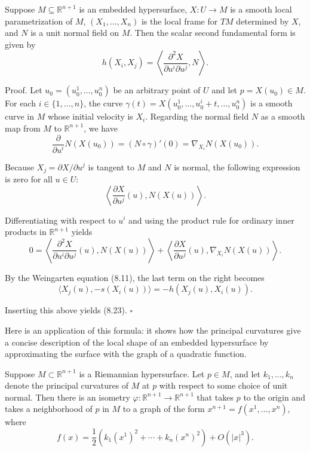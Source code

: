 \begin{proposition}
\label{prop:second-fundamental-form-coordinate-formula}
Suppose $M \subseteq \mathbb{R}^{n+1}$ is an embedded hypersurface, $X: U \to M$ is a smooth local parametrization of $M$, $(X_1,\ldots,X_n)$ is the local frame for $TM$ determined by $X$, and $N$ is a unit normal field on $M$. Then the scalar second fundamental form is given by
\begin{equation}
h(X_i, X_j) = \left\langle \frac{\partial^2 X}{\partial u^i \partial u^j}, N \right\rangle.
\tag{8.23}
\end{equation}
\end{proposition}

Proof. Let $u_0 = (u_0^1, \ldots, u_0^n)$ be an arbitrary point of $U$ and let $p = X(u_0) \in M$. For each $i \in \{1,\ldots,n\}$, the curve $\gamma(t) = X(u_0^1, \ldots, u_0^i + t, \ldots, u_0^n)$ is a smooth curve in $M$ whose initial velocity is $X_i$. Regarding the normal field $N$ as a smooth map from $M$ to $\mathbb{R}^{n+1}$, we have
\[
\frac{\partial}{\partial u^i} N(X(u_0)) = (N \circ \gamma)'(0) = \nabla_{X_i} N(X(u_0)).
\]

Because $X_j = \partial X/\partial u^j$ is tangent to $M$ and $N$ is normal, the following expression is zero for all $u \in U$:
\[
\left\langle \frac{\partial X}{\partial u^j}(u), N(X(u)) \right\rangle.
\]

Differentiating with respect to $u^i$ and using the product rule for ordinary inner products in $\mathbb{R}^{n+1}$ yields
\[
0 = \left\langle \frac{\partial^2 X}{\partial u^i \partial u^j}(u), N(X(u)) \right\rangle + \left\langle \frac{\partial X}{\partial u^j}(u), \nabla_{X_i} N(X(u)) \right\rangle.
\]

By the Weingarten equation (8.11), the last term on the right becomes
\[
\langle X_j(u), -s(X_i(u)) \rangle = -h(X_j(u), X_i(u)).
\]

Inserting this above yields (8.23). $\square$

Here is an application of this formula: it shows how the principal curvatures give a concise description of the local shape of an embedded hypersurface by approximating the surface with the graph of a quadratic function.

\begin{proposition}
\label{prop:principal-curvatures-local-shape}

Suppose $M \subset \mathbb{R}^{n+1}$ is a Riemannian hypersurface. Let $p \in M$, and let $k_1, \ldots, k_n$ denote the principal curvatures of $M$ at $p$ with respect to some choice of unit normal. Then there is an isometry $\varphi: \mathbb{R}^{n+1} \to \mathbb{R}^{n+1}$ that takes $p$ to the origin and takes a neighborhood of $p$ in $M$ to a graph of the form $x^{n+1} = f(x^1, \ldots, x^n)$, where
\begin{equation}
f(x) = \frac{1}{2}(k_1(x^1)^2 + \cdots + k_n(x^n)^2) + O(|x|^3).
\tag{8.24}
\end{equation}
\end{proposition}

